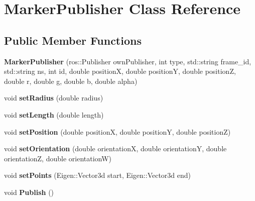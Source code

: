 \hypertarget{class_marker_publisher}{}\section{Marker\+Publisher Class Reference}
\label{class_marker_publisher}
\subsection*{Public Member Functions}
\begin{DoxyCompactItemize}
\item 
{\bfseries Marker\+Publisher} (ros\+::\+Publisher own\+Publisher, int type, std\+::string frame\+\_\+id, std\+::string ns, int id, double positionX, double positionY, double positionZ, double r, double g, double b, double alpha)\hypertarget{class_marker_publisher_a6c54c133dfa980451d2ff107ec7a0de4}{}\label{class_marker_publisher_a6c54c133dfa980451d2ff107ec7a0de4}

\item 
void {\bfseries set\+Radius} (double radius)\hypertarget{class_marker_publisher_a4eef35fa99fc45e44d7e66623ded27fe}{}\label{class_marker_publisher_a4eef35fa99fc45e44d7e66623ded27fe}

\item 
void {\bfseries set\+Length} (double length)\hypertarget{class_marker_publisher_a89ea91904c86ad63b73d353edc2c9c52}{}\label{class_marker_publisher_a89ea91904c86ad63b73d353edc2c9c52}

\item 
void {\bfseries set\+Position} (double positionX, double positionY, double positionZ)\hypertarget{class_marker_publisher_a2837e002998041a990ea34ad5cc8b54e}{}\label{class_marker_publisher_a2837e002998041a990ea34ad5cc8b54e}

\item 
void {\bfseries set\+Orientation} (double orientationX, double orientationY, double orientationZ, double orientationW)\hypertarget{class_marker_publisher_a84c510affdf87b564073309d56b6d665}{}\label{class_marker_publisher_a84c510affdf87b564073309d56b6d665}

\item 
void {\bfseries set\+Points} (Eigen\+::\+Vector3d start, Eigen\+::\+Vector3d end)\hypertarget{class_marker_publisher_ad1c365cd4f2d75fd49a78267c0c45050}{}\label{class_marker_publisher_ad1c365cd4f2d75fd49a78267c0c45050}

\item 
void {\bfseries Publish} ()\hypertarget{class_marker_publisher_acbaf9e788aab5b7ae58794f4dbdea6ee}{}\label{class_marker_publisher_acbaf9e788aab5b7ae58794f4dbdea6ee}


\end{DoxyCompactItemize}

